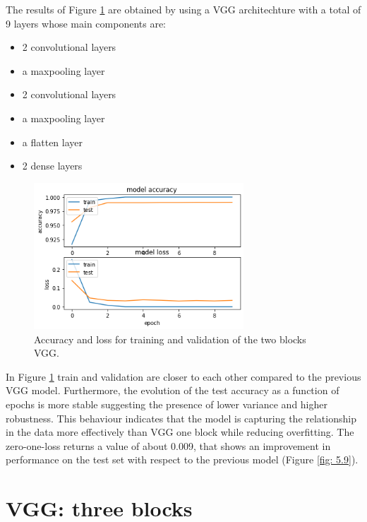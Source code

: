 \documentclass[10pt,english, openany]{book}
\begin{document}
The results of Figure \ref{fig:5.5} are obtained by using a VGG architechture with a total of 9 layers whose main components are:
\begin{itemize}
    \item 2 convolutional layers
    \item a maxpooling layer
    \item 2 convolutional layers
    \item a maxpooling layer
    \item a flatten layer
    \item 2 dense layers
\end{itemize}
\begin{figure}[H]
    \centering
    \includegraphics[width=0.7\textwidth]{Images/2.3. Accuracy loss VGG 2.png}
    \caption{ \label{fig:5.5}Accuracy and loss for training and validation of the two blocks VGG.}
\end{figure}


In Figure \ref{fig:5.5} train and validation are closer to each other compared to the previous VGG model. Furthermore, the evolution of the test accuracy as a function of epochs is more stable suggesting the presence of lower variance and higher robustness. This behaviour indicates that the model is capturing the relationship in the data more effectively than VGG one block while reducing overfitting.
The zero-one-loss returns a value of about 0.009, that shows an improvement in performance on the test set with respect to the previous model (Figure \ref{fig: 5.9}).




\newpage
\section{VGG: three blocks}
\end{document}
